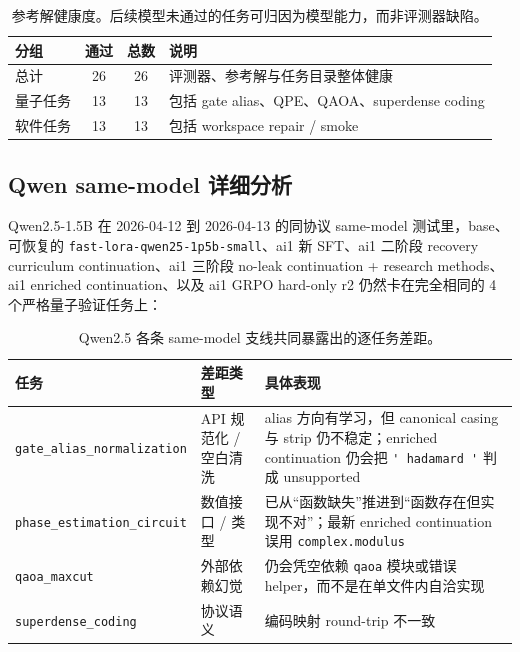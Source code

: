 \documentclass[11pt,a4paper]{article}
\newcommand{\code}[1]{\begingroup\ttfamily\footnotesize\nolinkurl{#1}\endgroup}
\begin{document}
\begin{table}[htbp]
\centering
\small
\begin{tabularx}{\textwidth}{p{2.5cm} c c Y}
\toprule
分组 & 通过 & 总数 & 说明 \\
\midrule
总计 & 26 & 26 & 评测器、参考解与任务目录整体健康 \\
量子任务 & 13 & 13 & 包括 gate alias、QPE、QAOA、superdense coding \\
软件任务 & 13 & 13 & 包括 workspace repair / smoke \\
\bottomrule
\end{tabularx}
\caption{参考解健康度。后续模型未通过的任务可归因为模型能力，而非评测器缺陷。}
\label{tab:reference-eval}
\end{table}

\subsection{Qwen same-model 详细分析}

Qwen2.5-1.5B 在 2026-04-12 到 2026-04-13 的同协议 same-model 测试里，base、可恢复的 \code{fast-lora-qwen25-1p5b-small}、ai1 新 SFT、ai1 二阶段 recovery curriculum continuation、ai1 三阶段 no-leak continuation + research methods、ai1 enriched continuation、以及 ai1 GRPO hard-only r2 仍然卡在完全相同的 4 个严格量子验证任务上：

\begin{table}[htbp]
\centering
\footnotesize
\begin{tabularx}{\textwidth}{p{3.5cm} p{1.8cm} Y}
\toprule
任务 & 差距类型 & 具体表现 \\
\midrule
\code{gate\_alias\_normalization} & API 规范化 / 空白清洗 & alias 方向有学习，但 canonical casing 与 strip 仍不稳定；enriched continuation 仍会把 \code{' hadamard '} 判成 unsupported \\
\code{phase\_estimation\_circuit} & 数值接口 / 类型 & 已从“函数缺失”推进到“函数存在但实现不对”；最新 enriched continuation 误用 \code{complex.modulus} \\
\code{qaoa\_maxcut} & 外部依赖幻觉 & 仍会凭空依赖 \code{qaoa} 模块或错误 helper，而不是在单文件内自洽实现 \\
\code{superdense\_coding} & 协议语义 & 编码映射 round-trip 不一致 \\
\bottomrule
\end{tabularx}
\caption{Qwen2.5 各条 same-model 支线共同暴露出的逐任务差距。}
\label{tab:qwen-failures}
\end{table}
\end{document}
